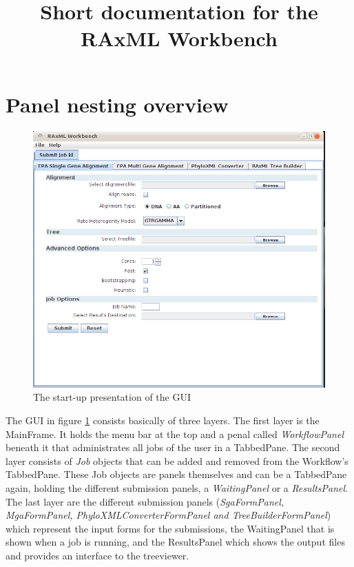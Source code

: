 \documentclass{scrartcl}
\begin{document}
\title{Short documentation for the RAxML Workbench}
\maketitle
\tableofcontents
\section{Panel nesting overview}
	\begin{figure}[htb]
		\centering
		\includegraphics[scale=0.40]{./workbench_complete}
		\caption{The start-up presentation of the GUI}
		\label{fig:wbcomplete}
	\end{figure}
\noindent	The GUI in figure \ref{fig:wbcomplete} consists basically of three layers. The first layer is the MainFrame. It holds the menu bar at the top and a penal called \textit{WorkflowPanel} beneath it that administrates all jobs of the user in a TabbedPane. The second layer consists of \textit{Job} objects that can be added and removed from the Workflow's TabbedPane. These Job objects are panels themselves and can be a TabbedPane again, holding the different submission panels, a \textit{WaitingPanel} or a \textit{ResultsPanel}. The last layer are the different submission panels (\textit{SgaFormPanel, MgaFormPanel, PhyloXMLConverterFormPanel and TreeBuilderFormPanel}) which represent the input forms for the submissions, the WaitingPanel that is shown when a job is running,  and the ResultsPanel which shows the output files and provides an interface to the treeviewer. 
\end{document}
